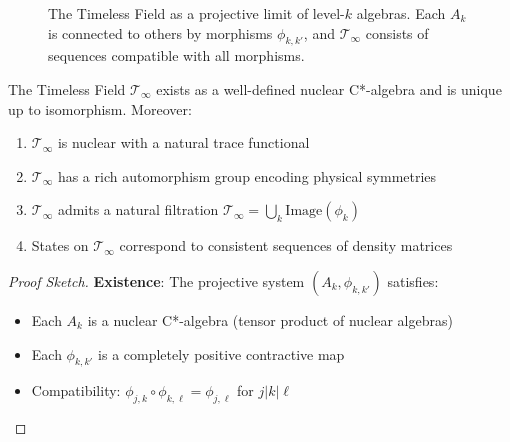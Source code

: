 \begin{defn}
\begin{figure}[h]
\caption{The Timeless Field as a projective limit of level-$k$ algebras. Each $A_k$ is connected to others by morphisms $\phi_{k,k'}$, and $\mathcal{T}_\infty$ consists of sequences compatible with all morphisms.}
\label{fig:projective-limit}
\end{figure}


\begin{level3}
\begin{thm}\label{thm:existence-uniqueness}
The Timeless Field $\mathcal{T}_\infty$ exists as a well-defined nuclear C*-algebra and is unique up to isomorphism. Moreover:
\begin{enumerate}
\item $\mathcal{T}_\infty$ is nuclear with a natural trace functional
\item $\mathcal{T}_\infty$ has a rich automorphism group encoding physical symmetries
\item $\mathcal{T}_\infty$ admits a natural filtration $\mathcal{T}_\infty = \bigcup_k \text{Image}(\phi_k)$
\item States on $\mathcal{T}_\infty$ correspond to consistent sequences of density matrices
\end{enumerate}
\end{thm}

\begin{proof}[Proof Sketch]
\textbf{Existence}: The projective system $(A_k, \phi_{k,k'})$ satisfies:
\begin{itemize}
\item Each $A_k$ is a nuclear C*-algebra (tensor product of nuclear algebras)
\item Each $\phi_{k,k'}$ is a completely positive contractive map
\item Compatibility: $\phi_{j,k} \circ \phi_{k,\ell} = \phi_{j,\ell}$ for $j|k|\ell$
\end{itemize}


\end{proof}
\end{level3}
\end{defn}

